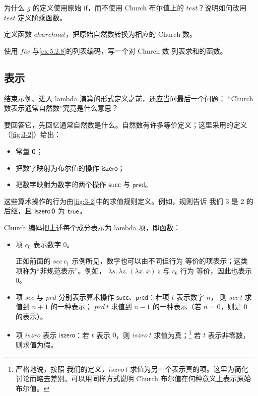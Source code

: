 \begin{exercise}[\(\star\)]
\label{ex:5.2.9}
为什么 \(g\) 的定义使用原始 if，而不使用 Church 布尔值上的
\(\mathit{test}\)？说明如何改用 \(\mathit{test}\) 定义阶乘函数。
\end{exercise}

\begin{exercise}[\(\star\star\)]
\label{ex:5.2.10}
定义函数 \(\mathit{churchnat}\)，把原始自然数转换为相应的 Church 数。
\end{exercise}

\begin{exercise}
\label{ex:5.2.11}
使用 \(\mathit{fix}\) 与\cref{ex:5.2.8}的列表编码，写一个对 Church 数
列表求和的函数。
\end{exercise}

\subsection*{表示}

结束示例、进入 lambda 演算的形式定义之前，还应当问最后一个问题：
“Church 数表示通常自然数”究竟是什么意思？

要回答它，先回忆通常自然数是什么。自然数有许多等价定义；这里采用的定义
（\cref{fig:3-2}）给出：
\begin{itemize}
  \item 常量 \(\mathsf{0}\)；
  \item 把数字映射为布尔值的操作 \(\mathsf{iszero}\)；
  \item 把数字映射为数字的两个操作 \(\mathsf{succ}\) 与
    \(\mathsf{pred}\)。
\end{itemize}
这些算术操作的行为由\cref{fig:3-2}中的求值规则定义。例如，规则告诉
我们 \(3\) 是 \(2\) 的后继，且 \(\mathsf{iszero}\,\mathsf{0}\) 为
\(\mathsf{true}\)。

Church 编码把上述每个成分表示为 lambda 项，即函数：
\begin{itemize}
  \item 项 \(c_0\) 表示数字 \(0\)。

    正如前面的 \(\mathit{scc}\ c_1\) 示例所见，数字也可以由不同但行为
    等价的项表示；这类项称为“非规范表示”。例如，
    \(\lambda s.\,\lambda z.\,(\lambda x.\,x)\,z\) 与 \(c_0\) 行为
    等价，因此也表示 \(0\)。

  \item 项 \(\mathit{scc}\) 与 \(\mathit{prd}\) 分别表示算术操作
    \(\mathsf{succ}\)、\(\mathsf{pred}\)：若项 \(t\) 表示数字 \(n\)，
    则 \(\mathit{scc}\ t\) 求值到 \(n+1\) 的一种表示；
    \(\mathit{prd}\ t\) 求值到 \(n-1\) 的一种表示（若 \(n=0\)，则是
    \(0\) 的表示）。

  \item 项 \(\mathit{iszro}\) 表示 \(\mathsf{iszero}\)：若 \(t\) 表示
    \(0\)，则 \(\mathit{iszro}\ t\) 求值为真；\footnote{严格地说，按照
    我们的定义，\(\mathit{iszro}\ t\) 求值为另一个表示真的项。这里为简化
    讨论而略去差别。可以用同样方式说明 Church 布尔值在何种意义上表示原始
    布尔值。} 若 \(t\) 表示非零数，则求值为假。
\end{itemize}

